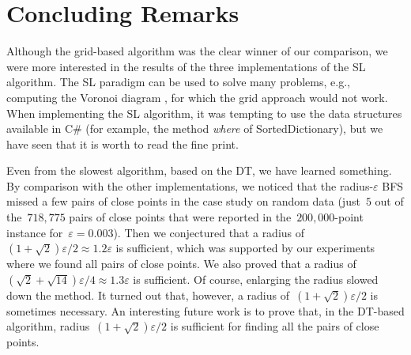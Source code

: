 \section{Concluding Remarks}\label{sec:DataStr_Conclusion}
Although the grid-based algorithm was the clear winner of our 
comparison, we were more interested in the results of the three 
implementations of the SL algorithm. 
The SL paradigm can be used to solve many problems,
e.g., computing the Voronoi diagram 
\parencite{Fortune1987Voronoi}, 
for which the grid approach would not work. 
When implementing the SL algorithm, 
it was tempting to use the data structures 
available in C\# (for example, the 
method \emph{where} of SortedDictionary), 
but we have seen that it is worth to read the fine print.



Even from the slowest algorithm, based on the DT, 
we have learned something. 
By comparison with the other implementations, 
we noticed that 
the radius-$\varepsilon$ BFS missed a few pairs of close points
in the case study on random data 
(just~$5$ out of the~$718{,}775$ pairs of close points
that were reported in the~$200{,}000$-point instance 
for~$\varepsilon =0.003$). 
Then we conjectured that 
a radius of~$(1+\sqrt{2})\varepsilon /2 
\approx 1.2\varepsilon$ is sufficient, 
which was supported by our experiments 
where we found all pairs of close points. 
We also proved that 
a radius of~$(\sqrt{2}+\sqrt{14})\varepsilon /4
\approx 1.3\varepsilon$ is sufficient. 
Of course, enlarging the radius slowed down the method. 
It turned out that, however, 
a radius of~$(1+\sqrt{2})\varepsilon /2$ 
is sometimes necessary.
An interesting future work is to prove that,
in the DT-based algorithm,
radius~$(1+\sqrt{2})\varepsilon /2$ is sufficient 
for finding all the pairs of close points.


